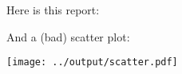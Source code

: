 \documentclass{article}
\begin{document}
Here is this report:



And a (bad) scatter plot:

\texttt{[image: ../output/scatter.pdf]}
\end{document}
